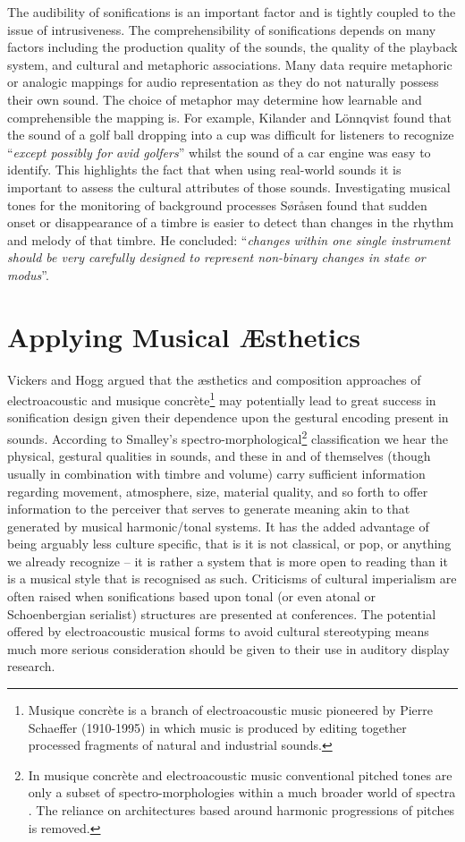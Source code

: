 \documentclass[runningheads]{llncs}
\newcommand{\killonq}{Kilander and L\"{o}nnqvist}
\begin{document}
The audibility of sonifications is an important factor and is tightly coupled to the issue of intrusiveness. The comprehensibility of sonifications depends on many factors including the production quality of the sounds, the quality of the playback system, and cultural and metaphoric associations. Many data require metaphoric or analogic mappings for audio representation as they do not naturally possess their own sound. The choice of metaphor may determine how learnable and comprehensible the mapping is. For example, {\killonq} found that the sound of a golf ball dropping into a cup was difficult for listeners to recognize ``\emph{except possibly for avid golfers}'' \cite{Kilander:2002} whilst the sound of a car engine was easy to identify. This highlights the fact that when using real-world sounds it is important to assess the cultural attributes of those sounds. Investigating musical tones for the monitoring of background processes S{\o}r{\aa}sen \cite{Sorasen:2005} found that sudden onset or disappearance of a timbre is easier to detect than changes in the rhythm and melody of that timbre. He concluded: ``\emph{changes within one single instrument should be very carefully designed to represent non-binary changes in state or modus}''.

\section{Applying Musical Æsthetics}
Vickers and Hogg \cite{Vickers:2006a} argued that the æsthetics and composition approaches of electroacoustic and musique concrète\footnote{Musique concrète is a branch of electroacoustic music pioneered by Pierre Schaeffer (1910-1995) in which music is produced by editing together processed fragments of natural and industrial sounds.} may potentially lead to great success in sonification design given their dependence upon the gestural encoding present in sounds. According to Smalley's \cite{Smalley:1986} spectro-morphological\footnote{In musique concrète and electroacoustic music conventional pitched tones are only a subset of spectro-morphologies within a much broader world of spectra \cite{Smalley:1986}. The reliance on architectures based around harmonic progressions of pitches is removed.} classification we hear the physical, gestural qualities in sounds, and these in and of themselves (though usually in combination with timbre and volume) carry sufficient information regarding movement, atmosphere, size, material quality, and so forth to offer information to the perceiver that serves to generate meaning akin to that generated by musical harmonic/tonal systems. It has the added advantage of being arguably less culture specific, that is it is not classical, or pop, or anything we already recognize -- it is rather a system that is more open to reading than it is a musical style that is recognised as such. Criticisms of cultural imperialism are often raised when sonifications based upon tonal (or even atonal or Schoenbergian serialist) structures are presented at conferences. The potential offered by electroacoustic musical forms to avoid cultural stereotyping means much more serious consideration should be given to their use in auditory display research.
\end{document}
